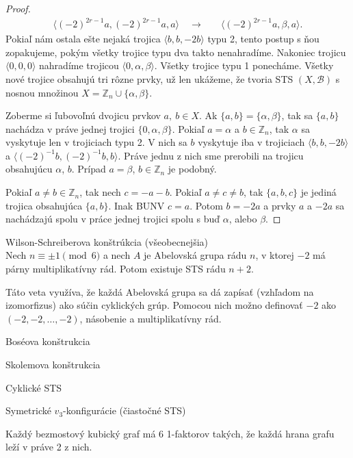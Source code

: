 \begin{proof}
\begin{align*}
	\langle (-2)^{2r - 1}a, (-2)^{2r - 1}a,              a \rangle \quad \rightarrow& \quad \langle (-2)^{2r - 1}a,          \beta,              a \rangle.
	\end{align*}
	Pokiaľ nám ostala ešte nejaká trojica $\langle b, b, -2b \rangle$ typu 2, tento postup s ňou zopakujeme, pokým všetky trojice typu dva takto nenahradíme.
	Nakoniec trojicu $\langle 0, 0, 0 \rangle$ nahradíme trojicou $\langle 0, \alpha, \beta \rangle$. Všetky trojice typu 1 ponecháme. Všetky nové trojice obsahujú tri rôzne prvky, už len ukážeme, že tvoria STS $(X, \mathcal{B})$ s nosnou množinou $X = \mathbb{Z}_n \cup \{\alpha, \beta \}$.
	
	Zoberme si ľubovoľnú dvojicu prvkov $a,\ b \in X$. Ak $\{ a, b \} = \{ \alpha, \beta \}$, tak sa $\{a, b\}$ nachádza v práve jednej trojici $\{0, \alpha, \beta \}$. Pokiaľ $a = \alpha$ a $b \in \mathbb{Z}_n$, tak $\alpha$ sa vyskytuje len v trojiciach typu 2. V nich sa $b$ vyskytuje iba v trojiciach $\langle b, b, -2b \rangle$ a $\langle (-2)^{-1}b, (-2)^{-1}b, b \rangle$. Práve jednu z nich sme prerobili na trojicu obsahujúcu $\alpha$, $b$. Prípad $a = \beta$, $b \in \mathbb{Z}_n$ je podobný.
	
	Pokiaľ $a \ne b \in \mathbb{Z}_n$, tak nech $c = - a - b$. Pokiaľ $a \ne c \ne b$, tak $\{a, b, c\}$ je jediná trojica obsahujúca $\{a, b\}$. Inak BUNV $c = a$. Potom $b = -2a$ a prvky $a$ a $-2a$ sa nachádzajú spolu v práce jednej trojici spolu s buď $\alpha$, alebo $\beta$.
\end{proof}

\begin{theorem_hard}{Wilson-Schreiberova konštrúkcia (všeobecnejšia)}\\
	Nech $n \equiv \pm 1 \pmod{6}$ a nech $A$ je Abelovská grupa rádu $n$, v ktorej $-2$ má párny multiplikatívny rád. Potom existuje STS rádu $n + 2$. 
\end{theorem_hard}

Táto veta využíva, že každá Abelovská grupa sa dá zapísať (vzhľadom na izomorfizus) ako súčin cyklických grúp. Pomocou nich možno definovať $-2$ ako $(-2,-2, \dots, -2)$, násobenie a multiplikatívny rád.

\TODO Boséova konštrukcia

\TODO Skolemova konštrukcia

\TODO Cyklické STS

\TODO Symetrické $v_3$-konfigurácie (čiastočné STS)

\begin{hypothesis}
Každý bezmostový kubický graf má 6 1-faktorov takých, že každá hrana grafu leží v práve 2 z nich.
\end{hypothesis}


